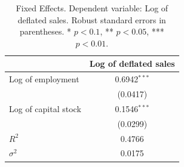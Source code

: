 \begin{table}[!htbp]
\centering
\begin{tabular}{lc}
\toprule
 & Log of deflated sales \\
\midrule
Log of employment & 0.6942$^{***}$ \\
 & (0.0417) \\
\addlinespace
Log of capital stock & 0.1546$^{***}$ \\
 & (0.0299) \\
\midrule
$R^2$ & 0.4766 \\
$\sigma^2$ & 0.0175 \\
\bottomrule
\end{tabular}
\caption{Fixed Effects. Dependent variable: Log of deflated sales. Robust standard errors in parentheses. * $p<0.1$, ** $p<0.05$, *** $p<0.01$.}
\label{tab:fixed_effects}
\end{table}
